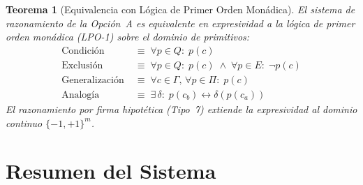 \documentclass[12pt]{article}
\newtheorem{theorem}{Teorema}[section]
\begin{document}
\begin{theorem}[Equivalencia con Lógica de Primer Orden Monádica]
	El sistema de razonamiento de la Opción~A es equivalente en expresividad a la
	lógica de primer orden monádica (LPO-1) sobre el dominio de primitivos:
	\begin{align*}
		\text{Condición} &\;\equiv\; \forall p \in Q:\; p(c) \\
		\text{Exclusión} &\;\equiv\; \forall p \in Q:\; p(c) \;\wedge\;
		\forall p \in E:\; \neg p(c) \\
		\text{Generalización} &\;\equiv\; \forall c \in \Gamma,\,\forall p \in \Pi:
		\; p(c) \\
		\text{Analogía} &\;\equiv\; \exists\,\delta:\;
		p(c_b) \leftrightarrow \delta(p(c_a))
	\end{align*}
	El razonamiento por firma hipotética (Tipo~7) extiende la expresividad al
	dominio continuo $\{-1,+1\}^m$.
\end{theorem}

\section{Resumen del Sistema}
\end{document}
